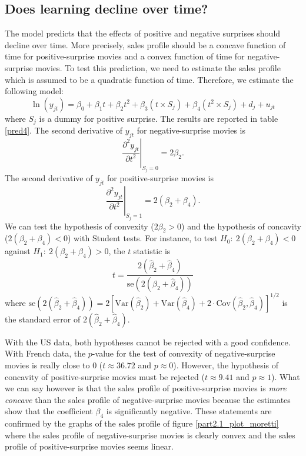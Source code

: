 \subsection{Does learning decline over time?}\label{subsec2.5}

The model predicts that the effects of positive and negative surprises should decline over time.
More precisely, sales profile should be a concave function of time for positive-surprise movies and a convex function of time for negative-surprise movies.
To test this prediction, we need to estimate the sales profile which is assumed to be a quadratic function of time.
Therefore, we estimate the following model:
\begin{equation*}
	\ln (y_{jt}) = \beta_0 + \beta_1 t + \beta_2 t^2 + \beta_3 (t \times S_j) + \beta_4 (t^2 \times S_j) + d_j + u_{jt}
\end{equation*}
where $S_j$ is a dummy for positive surprise.
The results are reported in table \ref{pred4}.
The second derivative of $y_{jt}$ for negative-surprise movies is 
\begin{equation*}
	\left.\frac{\partial^2 y_{jt}}{\partial t^2}\right|_{S_j=0} = 2 \beta_2.
\end{equation*}
The second derivative of $y_{jt}$ for positive-surprise movies is 
\begin{equation*}
	\left.\frac{\partial^2 y_{jt}}{\partial t^2}\right|_{S_j=1} = 2 (\beta_2 + \beta_4).
\end{equation*}
We can test the hypothesis of convexity ($2\beta_2 > 0$) and the hypothesis of concavity ($2(\beta_2 + \beta_4) < 0$) with Student tests.
For instance, to test $H_0:~2(\beta_2 + \beta_4) < 0$ against $H_1:~2(\beta_2 + \beta_4) > 0$, the $t$ statistic is
\begin{equation*}
	t = \frac{2(\hat{\beta}_2 + \hat{\beta}_4)}{\text{se}(2(\hat{\beta}_2 + \hat{\beta}_4))} 
\end{equation*}
where $\text{se}(2(\hat{\beta}_2 + \hat{\beta}_4)) = 2[\text{Var}(\hat{\beta}_2) + \text{Var}(\hat{\beta}_4) + 2\cdot \text{Cov}(\hat{\beta}_2, \hat{\beta}_4)]^{1/2}$ is the standard error of $2(\hat{\beta}_2 + \hat{\beta}_4)$.

With the US data, both hypotheses cannot be rejected with a good confidence.
With French data, the $p$-value for the test of convexity of negative-surprise movies is really close to 0 ($t \approx 36.72$ and $p \approx 0$). 
However, the hypothesis of concavity of positive-surprise movies must be rejected ($t \approx 9.41$ and $p \approx 1$).
What we can say however is that the sales profile of positive-surprise movies is \textit{more concave} than the sales profile of negative-surprise movies because the estimates show that the coefficient $\beta_4$ is significantly negative.
These statements are confirmed by the graphs of the sales profile of figure \ref{part2.1_plot_moretti} where the sales profile of negative-surprise movies is clearly convex and the sales profile of positive-surprise movies seems linear.

